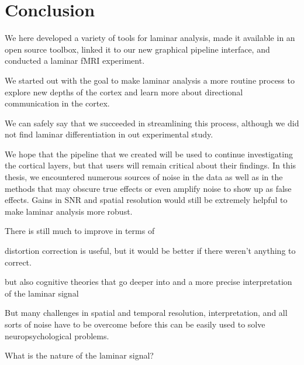 \section{Conclusion}
We here developed a variety of tools for laminar analysis, made it available in an open source toolbox, linked it to our new graphical pipeline interface, and conducted a laminar fMRI experiment. 

We started out with the goal to make laminar analysis a more routine process to explore new depths of the cortex and learn more about directional communication in the cortex.

 We can safely say that we succeeded in streamlining this process, although we did not find laminar differentiation in out experimental study.

 We hope that the pipeline that we created will be used to continue investigating the cortical layers, but that users will remain critical about their findings. In this thesis, we encountered numerous sources of noise in the data as well as in the methods that may obscure true effects or even amplify noise to show up as false effects. Gains in SNR and spatial resolution would still be extremely helpful to make laminar analysis more robust. 


There is still much to improve in terms of 

distortion correction is useful, but it would be better if there weren't anything to correct. 

but also cognitive theories that go deeper into 
and a more precise interpretation of the laminar signal


But many challenges in spatial and temporal resolution, interpretation, and all sorts of noise have to be overcome before this can be easily used to solve neuropsychological problems. 

What is the nature of the laminar signal?

\linespread{1.5}
\newpage






